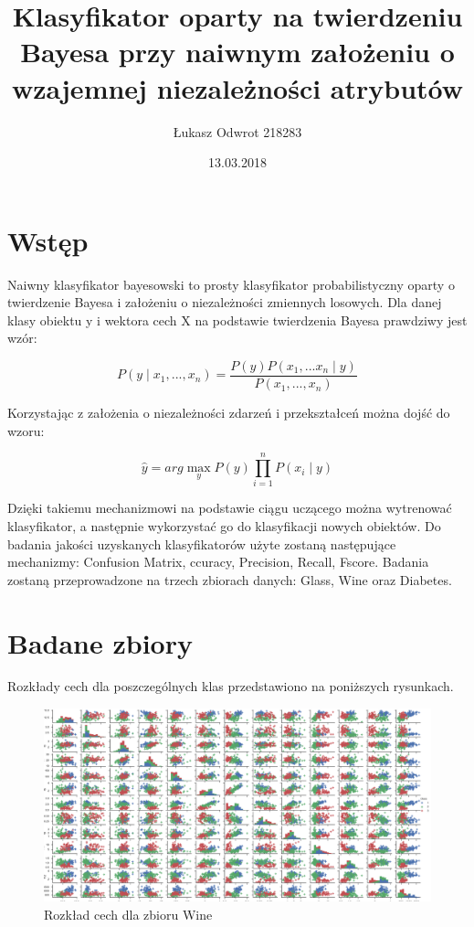 \documentclass[12pt,a4paper]{article}
\title{Klasyfikator oparty na twierdzeniu Bayesa przy naiwnym założeniu o wzajemnej niezależności atrybutów}
\date{13.03.2018}
\author{Łukasz Odwrot 218283}
\begin{document}
\maketitle
\thispagestyle{empty}
\newpage
\tableofcontents
\setcounter{page}{1}
\newpage

\section{Wstęp}
Naiwny klasyfikator bayesowski to prosty klasyfikator probabilistyczny oparty o twierdzenie Bayesa i założeniu o niezależności zmiennych losowych.  Dla danej klasy obiektu y i wektora cech X na podstawie twierdzenia Bayesa prawdziwy jest wzór:


$$ P(y\mid x_{1},..., x_{n}) = 
\frac
{P(y)P(x_{1},...x_{n}\mid y)}
{P(x_{1},...,x_{n})}
$$

Korzystając z założenia o niezależności zdarzeń i przekształceń można dojść do wzoru:

$$  \hat{y} = arg \max_{y} P(y) \prod_{i=1}^{n} P(x_{i} \mid y) $$

Dzięki takiemu mechanizmowi na podstawie ciągu uczącego można wytrenować klasyfikator, a następnie wykorzystać go do klasyfikacji nowych obiektów. Do badania jakości uzyskanych klasyfikatorów użyte zostaną następujące mechanizmy: Confusion Matrix, ccuracy, Precision, Recall, Fscore. Badania zostaną przeprowadzone na trzech zbiorach danych: Glass, Wine oraz Diabetes.

\section{Badane zbiory}

Rozkłady cech dla poszczególnych klas przedstawiono na poniższych rysunkach.

\begin{figure}[H]
\centering
\includegraphics[width=1\textwidth]{dsWineCombined.png}
\caption{Rozkład cech dla zbioru Wine}
\end{figure}
\end{document}
